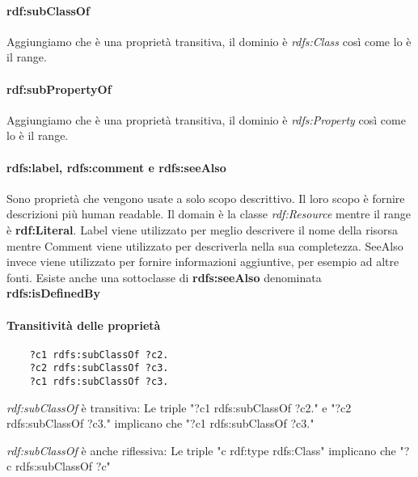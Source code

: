 \paragraph{rdf:subClassOf}
Aggiungiamo che è una proprietà transitiva, il dominio è \textit{rdfs:Class} così come lo è il range.

\paragraph{rdf:subPropertyOf}
Aggiungiamo che è una proprietà transitiva, il dominio è \textit{rdfs:Property} così come lo è il range.

\paragraph{rdfs:label, rdfs:comment e rdfs:seeAlso}
Sono proprietà che vengono usate a solo scopo descrittivo. Il loro scopo è fornire descrizioni più human readable. Il domain è la classe \textit{rdf:Resource} mentre il range è \textbf{rdf:Literal}. Label viene utilizzato per meglio descrivere il nome della risorsa mentre Comment viene utilizzato per descriverla nella sua completezza. SeeAlso invece viene utilizzato per fornire informazioni aggiuntive, per esempio ad altre fonti. Esiste anche una sottoclasse di \textbf{rdfs:seeAlso} denominata \textbf{rdfs:isDefinedBy}

\paragraph{Transitività delle proprietà}
\begin{verbatim}
	?c1 rdfs:subClassOf ?c2.
	?c2 rdfs:subClassOf ?c3.
	?c1 rdfs:subClassOf ?c3.
\end{verbatim}

\begin{info}
	\textit{rdf:subClassOf} è transitiva:\newline
	Le triple \textcolor{ao(english)}{"?c1 rdfs:subClassOf ?c2."} e \textcolor{ao(english)}{"?c2 rdfs:subClassOf ?c3."} implicano che \textcolor{ao(english)}{"?c1 rdfs:subClassOf ?c3."}
\end{info}

\begin{info}
	\textit{rdf:subClassOf} è anche riflessiva:\newline
	Le triple \textcolor{ao(english)}{"c rdf:type rdfs:Class"} implicano che \textcolor{ao(english)}{"?c rdfs:subClassOf ?c"}
\end{info}

